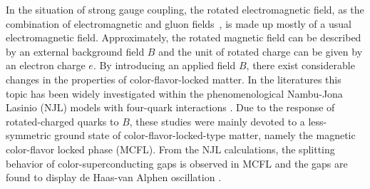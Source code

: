 \documentclass[prd, showpacs,nofootinbib,amsmath,amssymb]{revtex4}
\begin{document}
In the situation of strong gauge coupling, the rotated electromagnetic field, as the combination of
electromagnetic and gluon fields~\cite{alford1998qcd,alford2000magnetic}, is made up mostly of a usual
electromagnetic field. Approximately, the rotated magnetic field can be described by an external background field
$B$ and the unit of rotated charge can be given by an electron charge $e$.
By introducing an applied field $B$, there exist considerable changes in the properties of color-flavor-locked matter. 
In the literatures this topic has been widely investigated within the phenomenological Nambu-Jona Lasinio (NJL)
models with four-quark interactions \cite{ferrer2005magnetic,fukushima2008color,ferrer2006color,ferrer2007magnetic,sen2015anisotropic}. Due to the response of rotated-charged quarks to $B$, these studies were mainly devoted to a less-symmetric ground state of color-flavor-locked-type matter, namely the magnetic color-flavor locked phase
(MCFL). 
From the NJL calculations, the splitting behavior of color-superconducting gaps is observed in MCFL and the gaps are found to display de Haas-van Alphen
oscillation \cite{ferrer2005magnetic,fukushima2008color}.      
\end{document}
